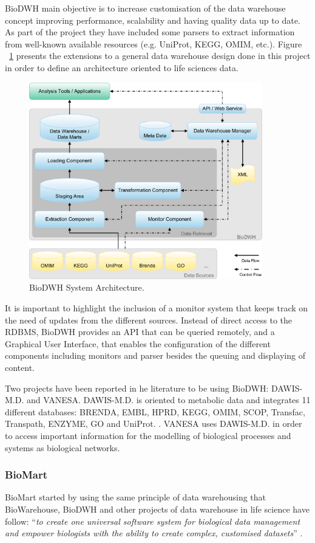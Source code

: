 BioDWH main objective is to increase customisation of the data warehouse concept improving performance, scalability and having quality data up to date. As part of the project they have included some parsers to extract information from well-known available resources (e.g. UniProt, KEGG, OMIM, etc.). Figure ~\ref{fig:biodwh} presents the extensions to a general data warehouse design done in this project in order to define an architecture oriented to life sciences data.

\begin{figure}  
\includegraphics[width=4in]{figures/dwh_architecture.png}
\caption[BioDWH System Architecture.]{BioDWH System Architecture.
\label{fig:biodwh}}
\end{figure}

It is important to highlight the inclusion of a monitor system that keeps track on the need of updates from the different sources. Instead of direct access to the RDBMS, BioDWH provides an API that can be queried remotely, and a Graphical User Interface, that enables the configuration of the different components including monitors and parser besides the queuing and displaying of content.

Two projects have been reported in he literature to be using BioDWH: DAWIS-M.D. and VANESA. DAWIS-M.D. is oriented to metabolic data and integrates 11 different databases: BRENDA, EMBL, HPRD, KEGG, OMIM, SCOP, Transfac, Transpath, ENZYME, GO and UniProt. \cite{HIP2010}. VANESA uses DAWIS-M.D. in order to access important information for the modelling of biological processes and systems as biological networks\cite{BRI2014}.

\subsubsection{BioMart}
BioMart started by using the same principle of data warehousing that BioWarehouse, BioDWH and other projects of data warehouse in life science have follow: ``\emph{to create one universal software system for biological data management and empower biologists with the ability to create complex, customised datasets}'' \cite{KAS2011}.

